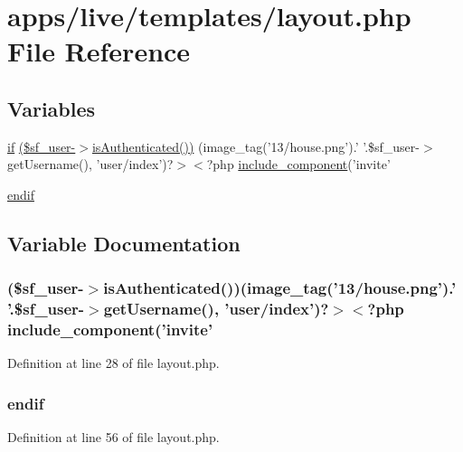 \hypertarget{live_2templates_2layout_8php}{\section{apps/live/templates/layout.php File Reference}
\label{live_2templates_2layout_8php}
}
\subsection*{Variables}
\begin{DoxyCompactItemize}
\item 
\hyperlink{live_2modules_2tournament_2templates_2__form_team_8php_ae30a307b320d8da5d9a945eaf68f7549}{if} \hyperlink{live_2templates_2layout_8php_a3aabe4bd3f398bdb25d5c26c6d2723db}{(\$sf\-\_\-user-\/$>$is\-Authenticated())} (image\-\_\-tag('13/house.\-png').' '.\$sf\-\_\-user-\/$>$get\-Username(), 'user/index')?$>$$<$?php \hyperlink{frontend_2templates_2__navigation_8php_a0f87936cfbec594a177cabbcec470b8d}{include\-\_\-component}('invite'
\item 
\hyperlink{live_2templates_2layout_8php_a82cd33ca97ff99f2fcc5e9c81d65251b}{endif}
\end{DoxyCompactItemize}


\subsection{Variable Documentation}
\hypertarget{live_2templates_2layout_8php_a3aabe4bd3f398bdb25d5c26c6d2723db}{
\subsubsection[{(\$sf\-\_\-user-\/$>$is\-Authenticated())}]{ (\$sf\-\_\-user-\/$>$is\-Authenticated())(image\-\_\-tag('13/house.\-png').' '.\$sf\-\_\-user-\/$>$get\-Username(), 'user/index')?$>$$<$?php {\bf include\-\_\-component}('invite'}}\label{live_2templates_2layout_8php_a3aabe4bd3f398bdb25d5c26c6d2723db}


Definition at line 28 of file layout.\-php.

\hypertarget{live_2templates_2layout_8php_a82cd33ca97ff99f2fcc5e9c81d65251b}{
\subsubsection[{endif}]{\setlength{\rightskip}{0pt plus 5cm}endif}}\label{live_2templates_2layout_8php_a82cd33ca97ff99f2fcc5e9c81d65251b}


Definition at line 56 of file layout.\-php.

